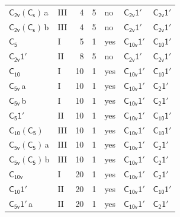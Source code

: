 \documentclass[10pt,a4paper]{article}
\numberwithin{equation}{section}
\newcommand{\grp}[1]{\mathsf{#1}}
\newcommand{\clsletter}[1]{\,{\scriptsize\color{black!55}#1}}
\begin{document}
{\begin{longtable}{@{}llrrlll@{}}
\href{C2v-C1v.pdf}{$\grp{C_{2v}}(\grp{C_{s}})$}\clsletter{a} & III & 4 & 5 & no & \href{C2v-1p.pdf}{$\grp{C_{2v}1'}$} & \href{C2v-1p.pdf}{$\grp{C_{2v}1'}$}\\
\href{C2v-C1v.pdf}{$\grp{C_{2v}}(\grp{C_{s}})$}\clsletter{b} & III & 4 & 5 & no & \href{C2v-1p.pdf}{$\grp{C_{2v}1'}$} & \href{C2v-1p.pdf}{$\grp{C_{2v}1'}$}\\
\href{../../../rotation/data/pdf/C5.pdf}{$\grp{C_{5}}$} & I & 5 & 1 & yes & \href{C10v-1p.pdf}{$\grp{C_{10v}1'}$} & \href{C10-1p.pdf}{$\grp{C_{10}1'}$}\\
\href{C2v-1p.pdf}{$\grp{C_{2v}1'}$} & II & 8 & 5 & no & \href{C2v-1p.pdf}{$\grp{C_{2v}1'}$} & \href{C2v-1p.pdf}{$\grp{C_{2v}1'}$}\\
\href{../../../rotation/data/pdf/C10.pdf}{$\grp{C_{10}}$} & I & 10 & 1 & yes & \href{C10v-1p.pdf}{$\grp{C_{10v}1'}$} & \href{C10-1p.pdf}{$\grp{C_{10}1'}$}\\
\href{../../../rotation/data/pdf/C5v.pdf}{$\grp{C_{5v}}$}\clsletter{a} & I & 10 & 1 & yes & \href{C10v-1p.pdf}{$\grp{C_{10v}1'}$} & \href{C2-1p.pdf}{$\grp{C_{2}1'}$}\\
\href{../../../rotation/data/pdf/C5v.pdf}{$\grp{C_{5v}}$}\clsletter{b} & I & 10 & 1 & yes & \href{C10v-1p.pdf}{$\grp{C_{10v}1'}$} & \href{C2-1p.pdf}{$\grp{C_{2}1'}$}\\
\href{C5-1p.pdf}{$\grp{C_{5}1'}$} & II & 10 & 1 & yes & \href{C10v-1p.pdf}{$\grp{C_{10v}1'}$} & \href{C10-1p.pdf}{$\grp{C_{10}1'}$}\\
\href{C10-C5.pdf}{$\grp{C_{10}}(\grp{C_{5}})$} & III & 10 & 1 & yes & \href{C10v-1p.pdf}{$\grp{C_{10v}1'}$} & \href{C10-1p.pdf}{$\grp{C_{10}1'}$}\\
\href{C5v-C5.pdf}{$\grp{C_{5v}}(\grp{C_{5}})$}\clsletter{a} & III & 10 & 1 & yes & \href{C10v-1p.pdf}{$\grp{C_{10v}1'}$} & \href{C2-1p.pdf}{$\grp{C_{2}1'}$}\\
\href{C5v-C5.pdf}{$\grp{C_{5v}}(\grp{C_{5}})$}\clsletter{b} & III & 10 & 1 & yes & \href{C10v-1p.pdf}{$\grp{C_{10v}1'}$} & \href{C2-1p.pdf}{$\grp{C_{2}1'}$}\\
\href{../../../rotation/data/pdf/C10v.pdf}{$\grp{C_{10v}}$} & I & 20 & 1 & yes & \href{C10v-1p.pdf}{$\grp{C_{10v}1'}$} & \href{C2-1p.pdf}{$\grp{C_{2}1'}$}\\
\href{C10-1p.pdf}{$\grp{C_{10}1'}$} & II & 20 & 1 & yes & \href{C10v-1p.pdf}{$\grp{C_{10v}1'}$} & \href{C10-1p.pdf}{$\grp{C_{10}1'}$}\\
\href{C5v-1p.pdf}{$\grp{C_{5v}1'}$}\clsletter{a} & II & 20 & 1 & yes & \href{C10v-1p.pdf}{$\grp{C_{10v}1'}$} & \href{C2-1p.pdf}{$\grp{C_{2}1'}$}\\

\end{longtable}}
\end{document}
